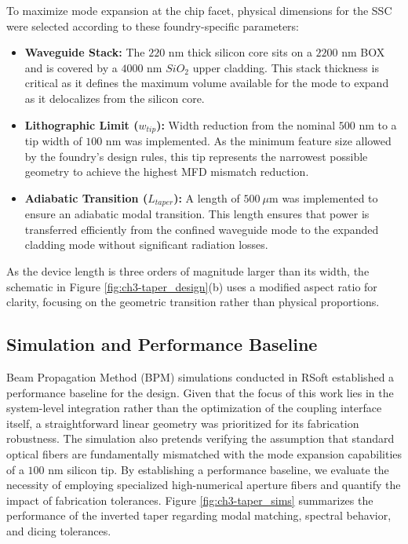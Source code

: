 To maximize mode expansion at the chip facet, physical dimensions for the SSC were selected 
according to these foundry-specific parameters:
\begin{itemize}
    \item \textbf{Waveguide Stack:} The $220 \text{ nm}$ thick silicon core sits on a $2200 
    \text{ nm}$ BOX and is covered by a $4000 \text{ nm}$ $SiO_2$ upper cladding. This stack 
    thickness is critical as it defines the maximum volume available for the mode to expand as it 
    delocalizes from the silicon core.
    \item \textbf{Lithographic Limit ($w_{tip}$):} Width reduction from the nominal 
    $500 \text{ nm}$ to a tip width of $100 \text{ nm}$ was implemented. As the minimum feature 
    size allowed by the foundry's design rules, this tip represents the narrowest possible geometry 
    to achieve the highest MFD mismatch reduction.
    \item \textbf{Adiabatic Transition ($L_{taper}$):} A length of $500 \ \mu\text{m}$ was
    implemented to ensure an adiabatic modal transition. This length ensures that power is 
    transferred efficiently from the confined waveguide mode to the expanded cladding mode without 
    significant radiation losses.
\end{itemize}

As the device length is three orders of magnitude larger than its width, the schematic in 
Figure \ref{fig:ch3-taper_design}(b) uses a modified aspect ratio for clarity, focusing on the 
geometric transition rather than physical proportions.



\subsection{Simulation and Performance Baseline}

Beam Propagation Method (BPM) simulations conducted in RSoft established a performance baseline for 
the design. Given that the focus of this work lies in the system-level integration rather 
than the optimization of the coupling interface itself, a straightforward linear geometry was 
prioritized for its fabrication robustness.
The simulation also pretends verifying the assumption that standard optical fibers are 
fundamentally mismatched with the mode expansion capabilities of a $100 \text{ nm}$ silicon tip. 
By establishing a performance baseline, we evaluate the necessity of employing specialized 
high-numerical aperture fibers and quantify the impact of fabrication tolerances.
Figure \ref{fig:ch3-taper_sims} summarizes the performance of the 
inverted taper regarding modal matching, spectral behavior, and dicing tolerances.

